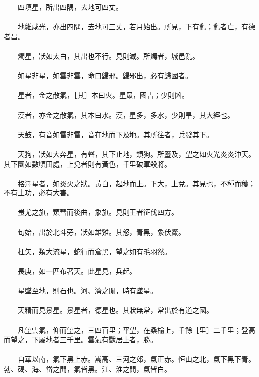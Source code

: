 　　四填星，所出四隅，去地可四丈。
\\\\
　　地維咸光，亦出四隅，去地可三丈，若月始出。所見，下有亂；亂者亡，有德者昌。
\\\\
　　燭星，狀如太白，其出也不行。見則滅。所燭者，城邑亂。
\\\\
　　如星非星，如雲非雲，命曰歸邪。歸邪出，必有歸國者。
\\\\
　　星者，金之散氣，［其］本曰火。星眾，國吉；少則凶。
\\\\
　　漢者，亦金之散氣，其本曰水。漢，星多，多水，少則旱，其大經也。
\\\\
　　天鼓，有音如雷非雷，音在地而下及地。其所往者，兵發其下。
\\\\
　　天狗，狀如大奔星，有聲，其下止地，類狗。所墮及，望之如火光炎炎沖天。其下圜如數頃田處，上兌者則有黃色，千里破軍殺將。
\\\\
　　格澤星者，如炎火之狀。黃白，起地而上。下大，上兌。其見也，不種而穫；不有土功，必有大害。
\\\\
　　蚩尤之旗，類彗而後曲，象旗。見則王者征伐四方。
\\\\
　　旬始，出於北斗旁，狀如雄雞。其怒，青黑，象伏鱉。
\\\\
　　枉矢，類大流星，蛇行而倉黑，望之如有毛羽然。
\\\\
　　長庚，如一匹布著天。此星見，兵起。
\\\\
　　星墜至地，則石也。河、濟之閒，時有墜星。
\\\\
　　天精而見景星。景星者，德星也。其狀無常，常出於有道之國。
\\\\
　　凡望雲氣，仰而望之，三四百里；平望，在桑榆上，千餘［里］二千里；登高而望之，下屬地者三千里。雲氣有獸居上者，勝。
\\\\
　　自華以南，氣下黑上赤。嵩高、三河之郊，氣正赤。恒山之北，氣下黑下青。勃、碣、海、岱之閒，氣皆黑。江、淮之閒，氣皆白。
\\\\
